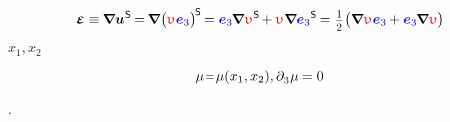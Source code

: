 \nopagebreak\vspace{-0.25em}
\begin{equation}
\infinitesimaldeformation
\equiv \hspace{-0.1ex}
\boldnabla {\bm{u}}^{\hspace{.1ex}\mathsf{S}} \hspace{-0.2ex}
= \hspace{-0.2ex}
\boldnabla \hspace{.1ex} \bigl(
   \antiplanedisplacement
   \hspace{.1ex}
   \mathcolor{blue}{\bm{e}_3}
\bigr)^{\hspace{-0.2ex} \mathsf{S} } \hspace{-0.25ex}
   = \mathcolor{blue}{\bm{e}_3}
   \hspace{-0.15ex} \boldnabla \hspace{.1ex}
   \antiplanedisplacement^{\hspace{.1ex}\mathsf{S}}
   \hspace{-0.25ex} +
   \antiplanedisplacement \hspace{.1ex}
   \tikzmark{beginZero2}
      \boldnabla
      \mathcolor{blue}{\bm{e}_3}
   \tikzmark{endZero2}^{\mathsf{S}} \hspace{-0.2ex}
   = \hspace{.1ex}
   \smalldisplaystyleonehalf \hspace{.1ex}
   \bigl(
      \boldnabla \hspace{.1ex} \antiplanedisplacement \hspace{.12ex}
      \mathcolor{blue}{\bm{e}_3} \hspace{-0.1ex}
      + \mathcolor{blue}{\bm{e}_3} \hspace{-0.15ex}
      \boldnabla \hspace{.1ex} \antiplanedisplacement
   \bigr)
\end{equation}%
%

${x_1, x_2}$

\begin{equation*}
\mu \narroweq \mu(x_1, x_2) ,
\partial_{
   \raisemath{-0.15ex}{ \mathcolor{blue}{3} }
} \hspace{.08ex} \mu \hspace{-0.1ex} = 0
\end{equation*}

.
